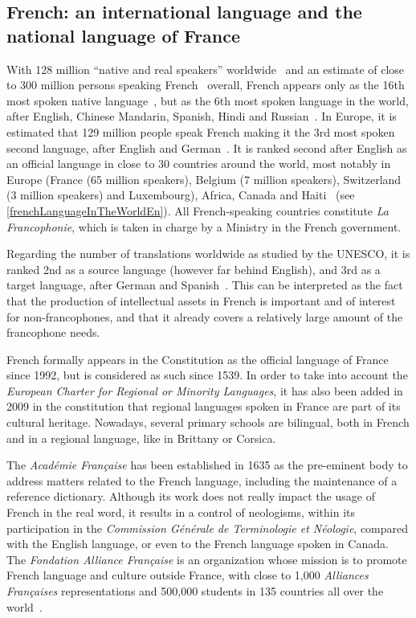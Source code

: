\clearpage


\begin{multicols}{2}

\subsection{French: an international language and the national language of France}
With 128 million ``native and real speakers'' worldwide~\cite{native} and an estimate
of close to 300 million persons speaking French~\cite{francais} overall, French
appears only as the 16th most spoken native language~\cite{Lewis2009}, but as the
6th most spoken language in the world, after English, Chinese
Mandarin, Spanish, Hindi and Russian~\cite{russe}. In Europe, it is estimated
that 129 million people speak French making it the 3rd most spoken
second language, after English and German~\cite{francais}. It is ranked second after
English as an official language in close to 30 countries around the
world, most notably in Europe (France (65 million speakers), Belgium
(7 million speakers), Switzerland (3 million speakers) and
Luxembourg), Africa, Canada and Haiti~\cite{haiti} (see \ref{frenchLanguageInTheWorldEn}). All
French-speaking countries constitute {\em La Francophonie}, which is taken
in charge by a Ministry in the French government.

Regarding the number of translations worldwide as studied by the
UNESCO, it is ranked 2nd as a source language (however far behind
English), and 3rd as a target language, after German and
Spanish~\cite{espagnol}. This can be interpreted as the fact that the production of
intellectual assets in French is important and of interest for
non-francophones, and that it already covers a relatively large amount
of the francophone needs.

French formally appears in the Constitution as the official language
of France since 1992, but is considered as such since 1539. In order
to take into account the {\em European Charter for Regional or Minority
Languages}, it has also been added in 2009 in the constitution that
regional languages spoken in France are part of its cultural
heritage. Nowadays, several primary schools are bilingual, both in
French and in a regional language, like in Brittany or Corsica.

The {\em Académie Française} has been established in 1635 as the pre-eminent
body to address matters related to the French language, including the
maintenance of a reference dictionary. Although its work does not
really impact the usage of French in the real word, it results in a
control of neologisms, within its participation in the {\em Commission
Générale de Terminologie et Néologie}, compared with the English
language, or even to the French language spoken in Canada. The
{\em Fondation Alliance Française} is an organization whose mission is to
promote French language and culture outside France, with close to
1,000 {\em Alliances Françaises} representations and 500,000 students in 135
countries all over the world~\cite{monde}.


\end{multicols}
